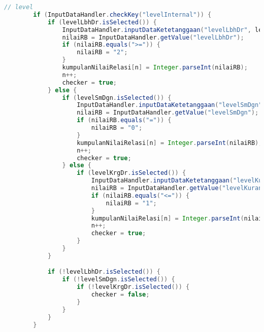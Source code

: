 \begin{lstlisting}[language=Java, caption=TampilanKondisiKetetanggaan.java]
        // level
        if (InputDataHandler.checkKey("levelInternal")) {
            if (levelLbhDr.isSelected()) {
                InputDataHandler.inputDataKetetanggaan("levelLbhDr", levelLbhDr.getText());
                nilaiRB = InputDataHandler.getValue("levelLbhDr");
                if (nilaiRB.equals(">=")) {
                    nilaiRB = "2";
                }
                kumpulanNilaiRelasi[n] = Integer.parseInt(nilaiRB);
                n++;
                checker = true;
            } else {
                if (levelSmDgn.isSelected()) {
                    InputDataHandler.inputDataKetetanggaan("levelSmDgn", levelSmDgn.getText());
                    nilaiRB = InputDataHandler.getValue("levelSmDgn");
                    if (nilaiRB.equals("=")) {
                        nilaiRB = "0";
                    }
                    kumpulanNilaiRelasi[n] = Integer.parseInt(nilaiRB);
                    n++;
                    checker = true;
                } else {
                    if (levelKrgDr.isSelected()) {
                        InputDataHandler.inputDataKetetanggaan("levelKurangDari", levelKrgDr.getText());
                        nilaiRB = InputDataHandler.getValue("levelKurangDari");
                        if (nilaiRB.equals("<=")) {
                            nilaiRB = "1";
                        }
                        kumpulanNilaiRelasi[n] = Integer.parseInt(nilaiRB);
                        n++;
                        checker = true;
                    }
                }
            }

            if (!levelLbhDr.isSelected()) {
                if (!levelSmDgn.isSelected()) {
                    if (!levelKrgDr.isSelected()) {
                        checker = false;
                    }
                }
            }
        }


\end{lstlisting}
